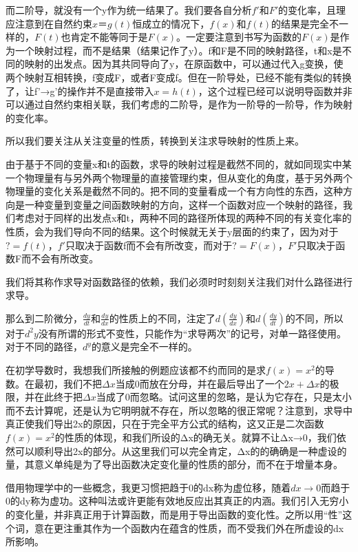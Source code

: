 \documentclass[fontset=none]{ctexart}
\begin{document}
而二阶导，就没有一个y作为统一结果了。我们要各自分析$f'$和$F'$的变化率，且理应注意到在自然约束$x＝g(t)$恒成立的情况下，$f(x)$和$f(t)$的结果是完全不一样的，$F(t)$也肯定不能等同于是$F(x)$。一定要注意到书写为函数的$F(x)$是作为一个映射过程，而不是结果（结果记作了y）。f和F是不同的映射路径，t和x是不同的映射的出发点。因为其共同导向了y，在原函数中，可以通过代入g变换，使两个映射互相转换，f变成F，或者F变成f。但在一阶导处，已经不能有类似的转换了，让f'→g'的操作并不是直接带入$x=h(t)$，这个过程已经可以说明导函数并非可以通过自然约束相关联，我们考虑的二阶导，是作为一阶导的一阶导，作为映射的变化率。

所以我们要关注从关注变量的性质，转换到关注求导映射的性质上来。

由于基于不同的变量x和t的函数，求导的映射过程是截然不同的，就如同现实中某一个物理量有与另外两个物理量的直接管理约束，但从变化的角度，基于另外两个物理量的变化关系是截然不同的。把不同的变量看成一个有方向性的东西，这种方向是一种变量到变量之间函数映射的方向，这样一个函数对应一个映射的路径，我们考虑对于同样的出发点x和t，两种不同的路径所体现的两种不同的有关变化率的性质，会为我们导向不同的结果。这个时候就无关于y层面的约束了，因为对于$?=f(t)$，$f'$只取决于函数f而不会有所改变，而对于$?=F(x)$，$F'$只取决于函数F而不会有所改变。

我们将其称作求导对函数路径的依赖，我们必须时时刻刻关注我们对什么路径进行求导。

那么到二阶微分，$\frac{dy}{dt}$和$\frac{dy}{dx}$的性质上的不同，注定了$d\left( \frac{dy}{dx} \right) $和$d\left( \frac{dy}{dt} \right) $的不同，所以对于$d^2y$没有所谓的形式不变性，只能作为“求导两次”的记号，对单一路径使用。对于不同的路径，$d^y$的意义是完全不一样的。













在初学导数时，我想我们所接触的例题应该都不约而同的是求$f(x)=x^2$的导数。在最初，我们不把$\Delta x$当成0而放在分母，并在最后导出了一个$2x+\Delta x$的极限，并在此终于把$\Delta x$当成了0而忽略。试问这里的忽略，是认为它存在，只是太小而不去计算呢，还是认为它明明就不存在，所以忽略的很正常呢？注意到，求导中真正使我们导出2x的原因，只在于完全平方公式的结构，这又正是二次函数$f(x)=x^2$的性质的体现，和我们所设的Δx的确无关。就算不让Δx→0，我们依然可以顺利导出2x的部分。从这里我们可以完全肯定，Δx的的确确是一种虚设的量，其意义单纯是为了导出函数决定变化量的性质的部分，而不在于增量本身。

借用物理学中的一些概念，我更习惯把趋于0的dx称为虚位移，随着$dx\to0$而趋于0的dy称为虚功。这种叫法或许更能有效地反应出其真正的内涵。我们引入无穷小的变化量，并非真正用于计算函数，而是用于导出函数的变化性。之所以用“性”这个词，意在更注重其作为一个函数内在蕴含的性质，而不受我们外在所虚设的dx所影响。
\end{document}
